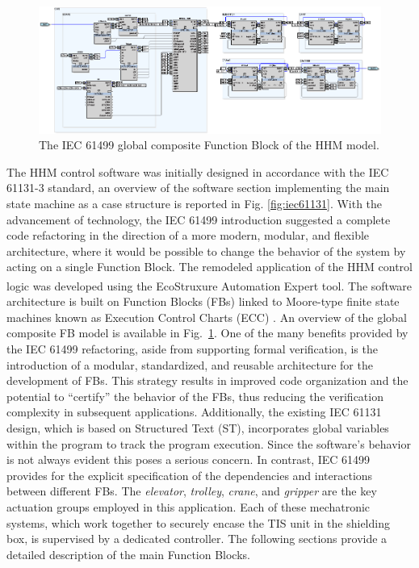 \documentclass{ieeeojies}
\newcommand{\quotes}[1]{``#1''}
\begin{document}
\begin{figure}
	\centering
    \includegraphics[width=\textwidth]{pictures/lilli05.eps}
    \caption{The IEC 61499 global composite Function Block of the HHM model.} 
    \label{fig:model}
\end{figure}

The HHM control software was initially designed in accordance with the IEC 61131-3 standard, an overview of the software section implementing the main state machine as a case structure is reported in Fig. \ref{fig:iec61131}.
With the advancement of technology, the IEC 61499 introduction suggested a complete code refactoring in the direction of a more modern, modular, and flexible architecture, where it would be possible to change the behavior of the system by acting on a single Function Block. 
The remodeled application of the HHM control logic was developed using the EcoStruxure\textsuperscript{\texttrademark} Automation Expert tool. The software architecture is built on Function Blocks (FBs) linked to Moore-type finite state machines known as Execution Control Charts (ECC) \cite{Lee2017}. An overview of the global composite FB model is available in \mbox{Fig. \ref{fig:model}}.
One of the many benefits provided by the IEC 61499 refactoring, aside from supporting formal verification, is the introduction of a modular, standardized, and reusable architecture for the development of FBs.
This strategy results in improved code organization and the potential to \quotes{certify} the behavior of the FBs, thus reducing the verification complexity in subsequent applications. Additionally, the existing IEC 61131 design, which is based on Structured Text (ST), incorporates global variables within the program to track the program execution.
Since the software's behavior is not always evident this poses a serious concern. 
In contrast, IEC 61499 provides for the explicit specification of the dependencies and interactions between different FBs.
The \textit{elevator}, \textit{trolley}, \textit{crane}, and \textit{gripper} are the key actuation groups employed in this application. Each of these mechatronic systems, which work together to securely encase the TIS unit in the shielding box, is supervised by a dedicated controller. The following sections provide a detailed description of the main Function Blocks.
\end{document}
